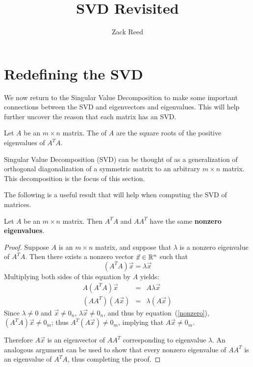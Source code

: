 \documentclass{ximera}
\author{Zack Reed}
\title{SVD Revisited}
\begin{document}
\begin{abstract}

\end{abstract}
\maketitle

\section*{Redefining the SVD}
We now return to the Singular Value Decomposition to make some important connections between the SVD and eigenvectors and eigenvalues. This will help further uncover the reason that each matrix has an SVD.
 
\begin{definition}\label{singularvalues}
Let $A$ be an $m\times n$ matrix. The  of $A$ are the square roots of the positive
eigenvalues of $A^TA.$
\end{definition}
 
Singular Value Decomposition (SVD) can be thought of as
a generalization of orthogonal diagonalization of a symmetric matrix
to an arbitrary $m\times n$ matrix. This decomposition is the focus of this section.
 
The following is a useful result that will help when computing the SVD of matrices.
 
\begin{lemma}\label{lem:samenonzeroeigenvalues}
Let $A$ be an $m \times n$ matrix. Then $A^TA$ and $AA^T$ have the same \textbf{nonzero eigenvalues}.
\end{lemma}
 
\begin{proof}
Suppose $A$ is an $m\times n$ matrix, and suppose that  $\lambda$ is a nonzero eigenvalue of $A^TA$.
Then there exists a nonzero vector $\vec{x} \in \mathbb{R}^n$ such that
\begin{equation}\label{nonzero}
(A^TA)\vec{x}=\lambda \vec{x}
\end{equation}
Multiplying both sides of this equation by $A$ yields:
\begin{eqnarray*}
A(A^TA)\vec{x} & = & A\lambda \vec{x}\\
(AA^T)(A\vec{x}) & = & \lambda (A\vec{x})
\end{eqnarray*}
Since $\lambda\neq 0$ and $\vec{x}\neq 0_n$, $\lambda \vec{x}\neq 0_n$,
and thus by equation~(\ref{nonzero}),
$(A^TA)\vec{x}\neq 0_m$; thus $A^T(A\vec{x})\neq 0_m$,
implying that $A\vec{x}\neq 0_m$.
 
Therefore $A\vec{x}$ is an eigenvector of $AA^T$ corresponding to eigenvalue
$\lambda$.  An analogous argument can be used to show that every
nonzero eigenvalue of $AA^T$ is an eigenvalue of $A^TA$, thus
completing the proof.
\end{proof}
 
\end{document}
